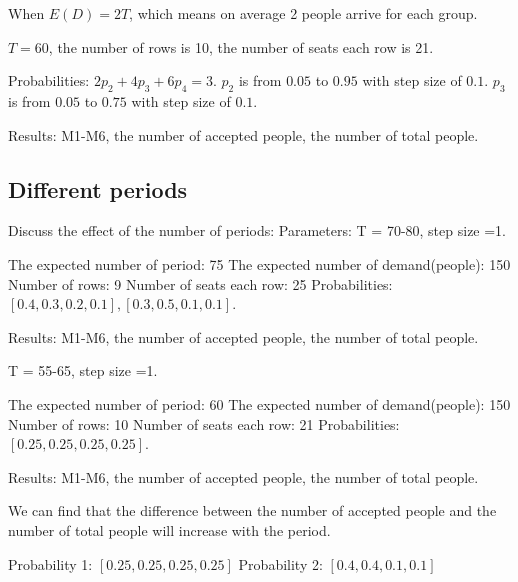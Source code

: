 % 

When $E(D) = 2T$, which means on average 2 people arrive for each group.

$T = 60$, the number of rows is 10, the number of seats each row is 21.

Probabilities: 
$2p_2 + 4p_3 + 6p_4 =3$. $p_2$ is from $0.05$ to $0.95$ with step size of $0.1$. $p_3$ is from $0.05$ to $0.75$ with step size of $0.1$.

Results: M1-M6, the number of accepted people, the number of total people.

% 

\subsection{Different periods}
Discuss the effect of the number of periods: 
Parameters: T = 70-80, step size =1.

The expected number of period: 75
The expected number of demand(people): 150
Number of rows: 9
Number of seats each row: 25
Probabilities: $[0.4, 0.3, 0.2, 0.1], [0.3, 0.5, 0.1, 0.1]$.

Results: M1-M6, the number of accepted people, the number of total people.

% 

% 

T = 55-65, step size =1.

The expected number of period: 60
The expected number of demand(people): 150
Number of rows: 10
Number of seats each row: 21
Probabilities: $[0.25, 0.25, 0.25, 0.25]$.

Results: M1-M6, the number of accepted people, the number of total people.

We can find that the difference between the number of accepted people and the number of total people will increase with the period. 

Probability 1: $[0.25, 0.25, 0.25, 0.25]$
Probability 2: $[0.4, 0.4, 0.1, 0.1]$

